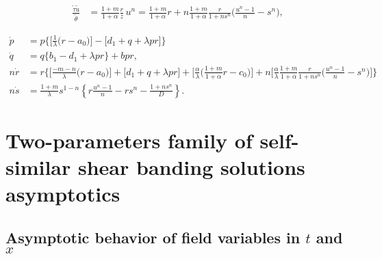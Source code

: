 \documentclass[a4paper,11pt]{article}
\def\tg{{\tilde{\gamma}}}
\def\tv{{\tilde{v}}}
\def\tth{{\tilde{\theta}}}
\def\ts{{\tilde{\tau}}}
\def\tu{{\tilde{u}}}
\def\dpp{\dot{p}}
\def\dqq{\dot{q}}
\def\drr{\dot{r}}
\begin{document}
\begin{align*}
 \frac{\ts\tu}{\tth} &= \frac{1+m}{1+\alpha} \frac{r}{z}\,u^n = \frac{1+m}{1+\alpha} r + n\frac{1+m}{1+\alpha} \frac{r}{1+ns^n}\Big(\frac{u^n-1}{n}-s^n\Big),%
\end{align*}





\begin{equation}
\begin{aligned}
  {\dpp}&=p\bigg\{\Big[\frac{1}{\lambda }\Big(r-a_0\Big)\Big] -\Big[d_1 + q + \lambda p r\Big]\bigg\}\\
  {\dqq}&=q\bigg\{b_1-d_1 + \lambda p r\bigg\} +bpr,\\
 n{\drr}&=r\bigg\{\Big[\frac{-m-n}{\lambda }\Big(r-a_0\Big)\Big]+\Big[d_1 + q + \lambda p r\Big]+\Big[\frac{\alpha}{\lambda }\Big(\frac{1+m}{1+\alpha}r-c_0\Big)\Big] + n\Big[\frac{\alpha}{\lambda }\frac{1+m}{1+\alpha} \frac{r}{1+ns^n}\Big(\frac{u^n-1}{n}-s^n\Big)\Big]\bigg\}\\
 n\dot{s}&=\frac{1+m}{\lambda}s^{1-n} \left\{r\frac{u^n-1}{n} - rs^n -\frac{1+ns^n}{D}\right\}.
\end{aligned}
\end{equation}

\pagebreak


\pagebreak

\section{Two-parameters family of self-similar shear banding solutions asymptotics}
\subsection{Asymptotic behavior of field variables in $t$ and $x$}
\end{document}
